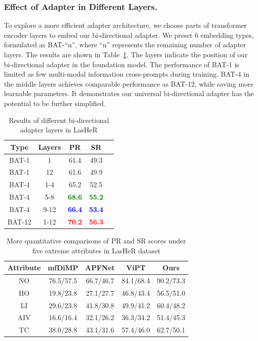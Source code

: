 \documentclass[letterpaper]{article} %
\begin{document}
\subsubsection{Effect of Adapter in Different Layers.}

To explore a more efficient adapter architecture, we choose parts of transformer encoder layers to embed our bi-directional adapter.
We preset 6 embedding types, formulated as BAT-``n'', where ``n'' represents the remaining number of adapter layers.
The results are shown in Table~\ref{tabadapternum}. The layers indicate the position of our bi-directional adapter in the foundation model.
The performance of BAT-1 is limited as few multi-modal information cross-prompts during training.
BAT-4 in the middle layers achieves comparable performance as BAT-12, while saving more learnable parameters. It demonstrates our universal bi-directional adapter has the potential to be further simplified.



\begin{table}[t]
\caption{Results of different bi-directional adapter layers in LasHeR}
\centering
\begin{tabular}{ccccc}
\toprule
Type&Layers&PR&SR \\
\midrule
BAT-1&1&  61.4  &49.3 \\
BAT-1&12&  61.6 &49.9 \\
BAT-4&1-4&  65.2&52.5 \\
BAT-4&5-8&  \textbf{\textcolor{green}{68.6}}&\textbf{\textcolor{green}{55.2}} \\
BAT-4&9-12&\textbf{\textcolor{blue}{66.4}} &\textbf{\textcolor{blue}{53.4}} \\
BAT-12&1-12&\textbf{\textcolor{red}{70.2}} &\textbf{\textcolor{red}{56.3}} \\
\bottomrule
\end{tabular}
\label{tabadapternum}
\end{table}




\begin{table}[t]
\caption{More quantitative comparisons of PR and SR scores under five extreme attributes in LasHeR dataset}
\label{tab:attribute}
\centering
\begin{tabular}{ccccc}
\toprule
Attribute&mfDiMP&APFNet&ViPT&Ours \\
\midrule
 NO&76.5/57.5&66.7/46.7&84.1/68.4&90.2/73.3 \\
 HO&19.8/23.8&27.1/27.7&46.8/43.4&56.5/51.0 \\
 LI&29.6/23.8&41.8/30.8&49.9/41.2&60.4/48.2  \\
 AIV&16.6/16.4& 32.1/26.2&36.3/34.2&51.4/45.3  \\
 TC&38.0/28.8& 43.1/31.6& 57.4/46.0&62.7/50.1 \\
\bottomrule
\end{tabular}
\end{table}
\end{document}
